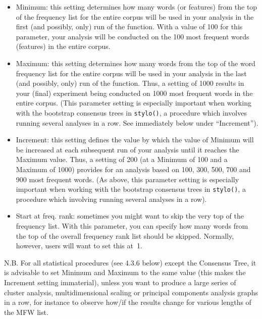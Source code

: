 \documentclass[11pt,a4paper]{article}
\def\margin#1{\marginpar{\textcolor{blue}{\footnotesize\tt #1}}}
\def\code#1{{\tt #1}}
\begin{document}
\begin{itemize}
\item Minimum: this setting determines how many words (or features) from
the top of the frequency list for the entire corpus will be used in
your analysis in the first (and possibly, only) run of the function.
With a value of 100 for this parameter, your analysis will be conducted
on the 100 most frequent words (features) in the entire corpus.\margin{mfw.min=}\margin{<integer>} 

\item Maximum: this setting determines how many words from the top of the
word frequency list for the entire corpus will be used in your analysis
in the last (and possibly, only) run of the function. Thus, a setting
of 1000 results in your (final) experiment being conducted on 1000
most frequent words in the entire corpus.\margin{mfw.max=\\<integer>}
(This parameter setting is especially important when working with
the bootstrap consensus trees in \code{stylo()}, a procedure which
involves running several analyses in a row. See immediately below
under ``Increment''). 

\item Increment: this setting defines the value by which the value of Minimum
will be increased at each subsequent run of your analysis until it
reaches the Maximum value. Thus, a setting of 200 (at a Minimum of
100 and a Maximum of 1000) provides for an analysis based on 100,
300, 500, 700 and 900 most frequent words.\margin{mfw.incr=}\margin{<integer>}
(As above, this parameter setting is especially important when working
with the bootstrap consensus trees in \code{stylo()}, a procedure
which involving running several analyses in a row). 

\item Start at freq. rank: sometimes you might want to skip the very top
of the frequency list\margin{start.at=}\margin{<integer>}.
With this parameter, you can specify how many words from the top of
the overall frequency rank list should be skipped. Normally, however,
users will want to set this at~1. 
\end{itemize}

N.B. For all statistical procedures (see 4.3.6 below) except the Consensus
Tree, it is advisable to set Minimum and Maximum to the same value
(this makes the Increment setting immaterial), unless you want to
produce a large series of cluster analysis, multidimensional scaling
or principal components analysis graphs in a row, for instance to
observe how/if the results change for various lengths of the MFW list.
\end{document}

